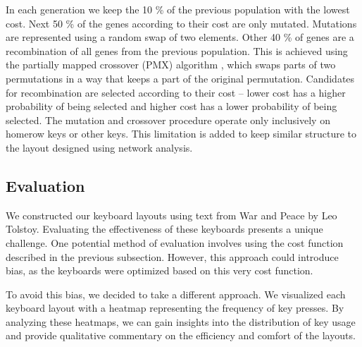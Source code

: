\documentclass[9pt,twocolumn,twoside]{pnas-report}
\begin{document}
{In each generation we keep the 10 \% of the previous population with the lowest cost.
Next 50 \% of the genes according to their cost are only mutated.
Mutations are represented using a random swap of two elements.
Other 40 \% of genes are a recombination of all genes from the previous population.
This is achieved using the partially mapped crossover (PMX) algorithm \cite{goldberg2014alleles}, which swaps parts of two permutations in a way that keeps a part of the original permutation.
Candidates for recombination are selected according to their cost -- lower cost has a higher probability of being selected and higher cost has a lower probability of being selected.
The mutation and crossover procedure operate only inclusively on homerow keys or other keys.
This limitation is added to keep similar structure to the layout designed using network analysis.

\subsection*{Evaluation}

We constructed our keyboard layouts using text from War and Peace by Leo Tolstoy.
Evaluating the effectiveness of these keyboards presents a unique challenge.
One potential method of evaluation involves using the cost function described in the previous subsection.
However, this approach could introduce bias, as the keyboards were optimized based on this very cost function.

To avoid this bias, we decided to take a different approach.
We visualized each keyboard layout with a heatmap representing the frequency of key presses.
By analyzing these heatmaps, we can gain insights into the distribution of key usage and provide qualitative commentary on the efficiency and comfort of the layouts.

}




\end{document}
